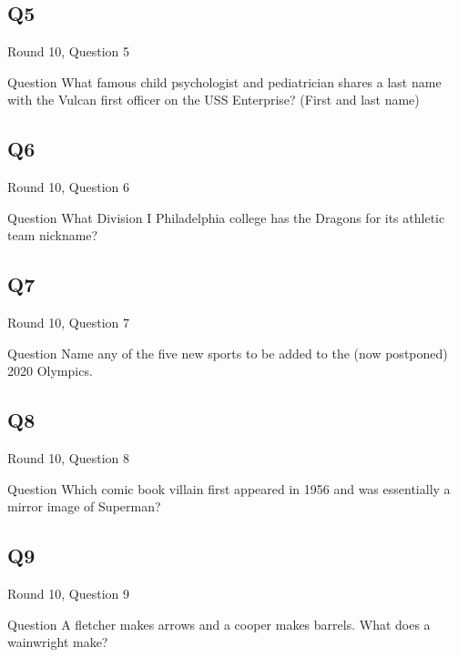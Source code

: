 \documentclass[11pt]{beamer}
\begin{document}
\subsection*{Q5}
\begin{frame}[t]{Round 10, Question 5}
\vspace{2em}
\begin{block}{Question}
What famous child psychologist and pediatrician shares a last name with the Vulcan first officer on the USS Enterprise? (First and last name)
\end{block}
\end{frame}
    

\subsection*{Q6}
\begin{frame}[t]{Round 10, Question 6}
\vspace{2em}
\begin{block}{Question}
What Division I Philadelphia college has the Dragons for its athletic team nickname\@?
\end{block}
\end{frame}
    

\subsection*{Q7}
\begin{frame}[t]{Round 10, Question 7}
\vspace{2em}
\begin{block}{Question}
Name any of the five new sports to be added to the (now postponed) 2020 Olympics.
\end{block}
\end{frame}
    

\subsection*{Q8}
\begin{frame}[t]{Round 10, Question 8}
\vspace{2em}
\begin{block}{Question}
Which comic book villain first appeared in 1956 and was essentially a mirror image of Superman\@?
\end{block}
\end{frame}
    

\subsection*{Q9}
\begin{frame}[t]{Round 10, Question 9}
\vspace{2em}
\begin{block}{Question}
A fletcher makes arrows and a cooper makes barrels. What does a wainwright make\@?
\end{block}
\end{frame}
    
\end{document}
